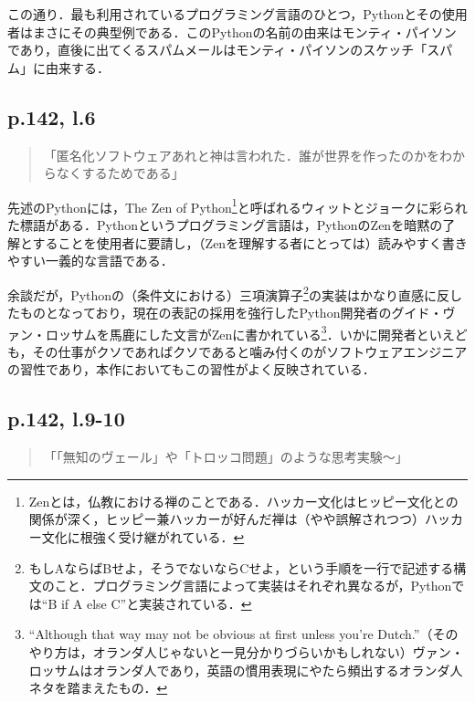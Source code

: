 \documentclass[10pt, a5paper, twoside]{jsarticle}
\theoremstyle{definition}
\begin{document}
			この通り．最も利用されているプログラミング言語のひとつ，Pythonとその使用者はまさにその典型例である．このPythonの名前の由来はモンティ・パイソンであり，直後に出てくるスパムメールはモンティ・パイソンのスケッチ「スパム」に由来する．

		\subsection{p.142, l.6}

			\begin{quote}
				
				「匿名化ソフトウェアあれと神は言われた．誰が世界を作ったのかをわからなくするためである」

			\end{quote}

			先述のPythonには，The Zen of Python\footnote{Zenとは，仏教における禅のことである．ハッカー文化はヒッピー文化との関係が深く，ヒッピー兼ハッカーが好んだ禅は（やや誤解されつつ）ハッカー文化に根強く受け継がれている．}と呼ばれるウィットとジョークに彩られた標語\cite{zen}がある．Pythonというプログラミング言語は，PythonのZenを暗黙の了解とすることを使用者に要請し，（Zenを理解する者にとっては）読みやすく書きやすい一義的な言語である．

			余談だが，Pythonの（条件文における）三項演算子\footnote{もしAならばBせよ，そうでないならCせよ，という手順を一行で記述する構文のこと．プログラミング言語によって実装はそれぞれ異なるが，Pythonでは``B if A else C''と実装されている．}の実装はかなり直感に反したものとなっており，現在の表記の採用を強行したPython開発者のグイド・ヴァン・ロッサムを馬鹿にした文言がZenに書かれている\footnote{``Although that way may not be obvious at first unless you're Dutch.''\cite{zen}（そのやり方は，オランダ人じゃないと一見分かりづらいかもしれない）ヴァン・ロッサムはオランダ人であり，英語の慣用表現にやたら頻出するオランダ人ネタを踏まえたもの．}．いかに開発者といえども，その仕事がクソであればクソであると噛み付くのがソフトウェアエンジニアの習性であり，本作においてもこの習性がよく反映されている．

		\subsection{p.142, l.9-10}

			\begin{quote}
				
				「「無知のヴェール」や「トロッコ問題」のような思考実験〜」

			\end{quote}
\end{document}
